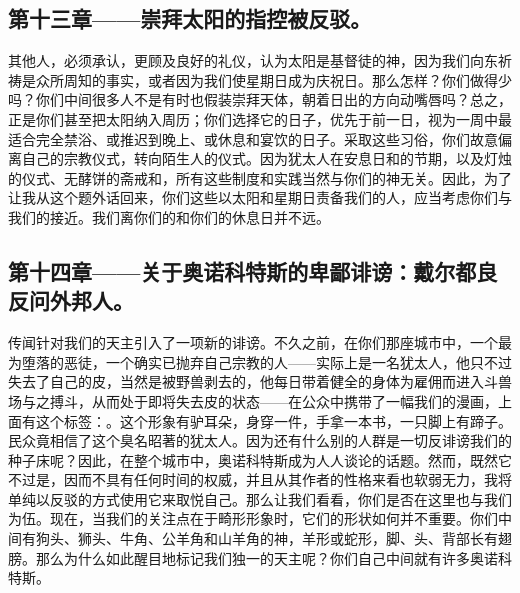 
\subsection{第十三章——崇拜太阳的指控被反驳。}

其他人，必须承认，更顾及良好的礼仪，认为太阳是基督徒的神，因为我们向东祈祷是众所周知的事实，或者因为我们使星期日成为庆祝日。那么怎样？你们做得少吗？你们中间很多人不是有时也假装崇拜天体，朝着日出的方向动嘴唇吗？总之，正是你们甚至把太阳纳入周历；你们选择它的日子，优先于前一日，视为一周中最适合完全禁浴、或推迟到晚上、或休息和宴饮的日子。采取这些习俗，你们故意偏离自己的宗教仪式，转向陌生人的仪式。因为犹太人在安息日和的节期，以及灯烛的仪式、无酵饼的斋戒和，所有这些制度和实践当然与你们的神无关。因此，为了让我从这个题外话回来，你们这些以太阳和星期日责备我们的人，应当考虑你们与我们的接近。我们离你们的和你们的休息日并不远。\par


\subsection{第十四章——关于奥诺科特斯的卑鄙诽谤：戴尔都良反问外邦人。}

传闻针对我们的天主引入了一项新的诽谤。不久之前，在你们那座城市中，一个最为堕落的恶徒，一个确实已抛弃自己宗教的人——实际上是一名犹太人，他只不过失去了自己的皮，当然是被野兽剥去的，他每日带着健全的身体为雇佣而进入斗兽场与之搏斗，从而处于即将失去皮的状态——在公众中携带了一幅我们的漫画，上面有这个标签：。这个形象有驴耳朵，身穿一件，手拿一本书，一只脚上有蹄子。民众竟相信了这个臭名昭著的犹太人。因为还有什么别的人群是一切反诽谤我们的种子床呢？因此，在整个城市中，奥诺科特斯成为人人谈论的话题。然而，既然它不过是，因而不具有任何时间的权威，并且从其作者的性格来看也软弱无力，我将单纯以反驳的方式使用它来取悦自己。那么让我们看看，你们是否在这里也与我们为伍。现在，当我们的关注点在于畸形形象时，它们的形状如何并不重要。你们中间有狗头、狮头、牛角、公羊角和山羊角的神，羊形或蛇形，脚、头、背部长有翅膀。那么为什么如此醒目地标记我们独一的天主呢？你们自己中间就有许多奥诺科特斯。\par


